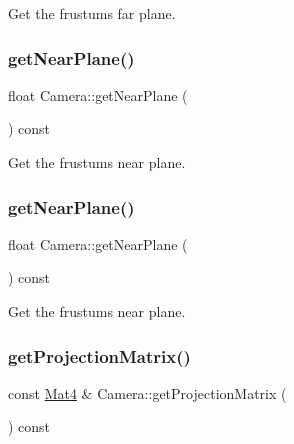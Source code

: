Get the frustum\textquotesingle{}s far plane. \mbox{\label{classCamera_a06c0abe6144c4b19aa68935134d15c5c}} 
\subsubsection{\texorpdfstring{get\+Near\+Plane()}{getNearPlane()}\hspace{0.1cm}{\footnotesize\ttfamily [1/2]}}
{\footnotesize\ttfamily float Camera\+::get\+Near\+Plane (\begin{DoxyParamCaption}{ }\end{DoxyParamCaption}) const\hspace{0.3cm}{\ttfamily [inline]}}

Get the frustum\textquotesingle{}s near plane. \mbox{\label{classCamera_a06c0abe6144c4b19aa68935134d15c5c}} 
\subsubsection{\texorpdfstring{get\+Near\+Plane()}{getNearPlane()}\hspace{0.1cm}{\footnotesize\ttfamily [2/2]}}
{\footnotesize\ttfamily float Camera\+::get\+Near\+Plane (\begin{DoxyParamCaption}{ }\end{DoxyParamCaption}) const\hspace{0.3cm}{\ttfamily [inline]}}

Get the frustum\textquotesingle{}s near plane. \mbox{\label{classCamera_a654a29037e5371e0fc5157fe6be89350}} 
\subsubsection{\texorpdfstring{get\+Projection\+Matrix()}{getProjectionMatrix()}\hspace{0.1cm}{\footnotesize\ttfamily [1/2]}}
{\footnotesize\ttfamily const \hyperlink{classMat4}{Mat4} \& Camera\+::get\+Projection\+Matrix (\begin{DoxyParamCaption}{ }\end{DoxyParamCaption}) const}

